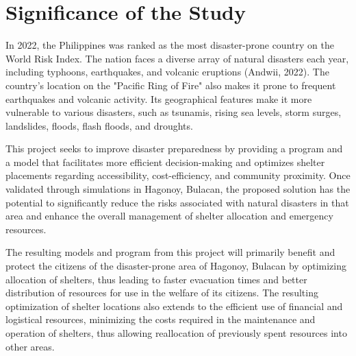 \section{Significance of the Study}

	In 2022, the Philippines was ranked as the most disaster-prone country on the World Risk Index. The nation faces a diverse array of natural disasters each year, including typhoons, earthquakes, and volcanic eruptions (Andwii, 2022). The country's location on the "Pacific Ring of Fire" also makes it prone to frequent earthquakes and volcanic activity. Its geographical features make it more vulnerable to various disasters, such as tsunamis, rising sea levels, storm surges, landslides, floods, flash floods, and droughts.
 

This project seeks to improve disaster preparedness by providing a program and a model that facilitates more efficient decision-making and optimizes shelter placements regarding accessibility, cost-efficiency, and community proximity. Once validated through simulations in Hagonoy, Bulacan, the proposed solution has the potential to significantly reduce the risks associated with natural disasters in that area and enhance the overall management of shelter allocation and emergency resources.


The resulting models and program from this project will primarily benefit and protect the citizens of the disaster-prone area of Hagonoy, Bulacan by optimizing allocation of shelters, thus leading to faster evacuation times and better distribution of resources for use in the welfare of its citizens. The resulting optimization of shelter locations also extends to the efficient use of financial and logistical resources, minimizing the costs required in the maintenance and operation of shelters, thus allowing reallocation of previously spent resources into other areas.


